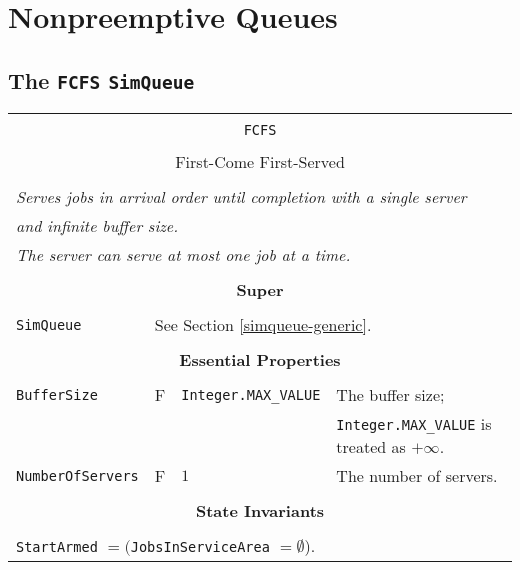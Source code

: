\documentclass[12pt]{book}
\begin{document}
\section{Nonpreemptive Queues}

\subsection{The \lstinline{FCFS} \lstinline{SimQueue}}

\begin{tabular}{|l|l|l|l|}
\hline
\multicolumn{4}{|c|}{} \\
\multicolumn{4}{|c|}{\lstinline[basicstyle=\large]{FCFS}} \\
\multicolumn{4}{|c|}{} \\
\multicolumn{4}{|c|}{First-Come First-Served} \\
\multicolumn{4}{|c|}{} \\
\hline
\multicolumn{4}{|l|}{\em Serves jobs in arrival order until completion with a single server} \\
\multicolumn{4}{|l|}{\em and infinite buffer size.} \\
\multicolumn{4}{|l|}{\em The server can serve at most one job at a time.} \\
\hline
\multicolumn{4}{|c|}{} \\
\multicolumn{4}{|c|}{\bf Super} \\
\multicolumn{4}{|c|}{} \\
\hline
\lstinline|SimQueue| & \multicolumn{3}{|l|}{See Section \ref{simqueue-generic}.} \\
\hline
\multicolumn{4}{|c|}{} \\
\multicolumn{4}{|c|}{\bf Essential Properties} \\
\multicolumn{4}{|c|}{} \\
\hline
\lstinline|BufferSize|      & F & \lstinline|Integer.MAX_VALUE|
                            & The buffer size; \\
                        & & & \lstinline|Integer.MAX_VALUE| is treated as $+\infty$. \\
\hline
\lstinline|NumberOfServers| & F & $1$
                            & The number of servers. \\
\hline
\multicolumn{4}{|c|}{} \\
\multicolumn{4}{|c|}{\bf State  Invariants} \\
\multicolumn{4}{|c|}{} \\
\hline
\multicolumn{4}{|l|}{\lstinline|StartArmed| $= ($\lstinline|JobsInServiceArea| $= \emptyset$).} \\

\end{tabular}
\end{document}
